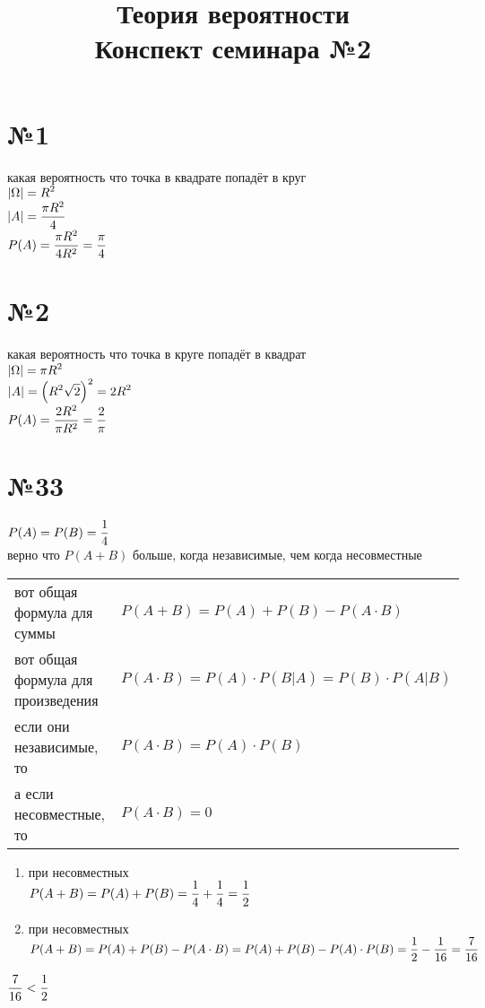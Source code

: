 \documentclass{article}
\title{Теория вероятности \\ Конспект семинара №2}
\begin{document}
  \maketitle

  \section*{№1}
  какая вероятность что точка в квадрате попадёт в круг \\
  $\displaystyle \left|\Omega\right| = R^2$ \\
  $\displaystyle \left|A\right| = \frac{\pi R^2}{4}$ \\
  $\displaystyle P(A) = \frac{\pi R^2}{4 R^2} = \frac{\pi}{4}$

  \section*{№2}
  какая вероятность что точка в круге попадёт в квадрат \\
  $\displaystyle \left|\Omega\right| = \pi R^2$ \\
  $\displaystyle \left|A\right| = \left(R^2 \sqrt{2}\right)^2 = 2R^2$ \\
  $\displaystyle P(A) = \frac{2 R^2}{\pi R^2} = \frac{2}{\pi}$

  \section*{№33}
  $\displaystyle P(A) = P(B) = \frac{1}{4}$ \\
  верно что $P(A+B)$ больше, когда независимые, чем когда несовместные \\
  \begin{tabular}{@{}ll}
    вот общая формула для суммы & $P(A+B) = P(A) + P(B) - P(A \cdot B)$ \\
    вот общая формула для произведения & $P(A \cdot B) = P(A) \cdot P(B | A) = P(B) \cdot P(A | B)$ \\
    если они независимые, то & $P(A \cdot B) = P(A) \cdot P(B)$ \\
    а если несовместные, то & $P(A \cdot B) = 0$ \\
  \end{tabular}

  \begin{enumerate}
    \item при несовместных \\
      $\displaystyle P(A+B) = P(A)+P(B) = \frac{1}{4} + \frac{1}{4} = \frac{1}{2}$
    \item при несовместных \\
      $\displaystyle P(A+B) = P(A)+P(B) - P(A \cdot B) = P(A)+P(B) - P(A) \cdot P(B) = \frac{1}{2} - \frac{1}{16} = \frac{7}{16}$
  \end{enumerate}
  $\displaystyle \frac{7}{16} < \frac{1}{2}$
\end{document}
